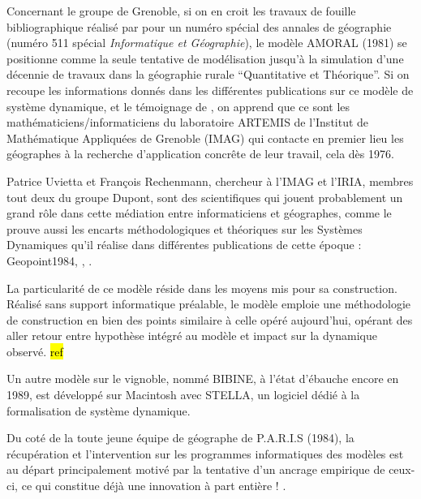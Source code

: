 Concernant le groupe de Grenoble, si on en croit les travaux de fouille bibliographique réalisé par \textcite{Rey1983} pour un numéro spécial des annales de géographie (numéro 511 spécial \textit{Informatique et Géographie}), le modèle AMORAL (1981) se positionne comme la seule tentative de modélisation jusqu'à la simulation d'une décennie de travaux dans la géographie rurale \enquote{Quantitative et Théorique}. Si on recoupe les informations donnés dans les différentes publications sur ce modèle de système dynamique, et le témoignage de \textcite{LeBerre1987}, on apprend que ce sont les mathématiciens/informaticiens du laboratoire ARTEMIS de l’Institut de Mathématique Appliquées de Grenoble (IMAG) qui contacte en premier lieu les géographes à la recherche d’application concrête de leur travail, cela dès 1976.

Patrice Uvietta et François Rechenmann, chercheur à l'IMAG et l'IRIA, membres tout deux du groupe Dupont, sont des scientifiques qui jouent probablement un grand rôle dans cette médiation entre informaticiens et géographes, comme le prouve aussi les encarts méthodologiques et théoriques sur les Systèmes Dynamiques qu'il réalise dans différentes publications de cette époque : Geopoint1984, \autocite{CGR1983}, \autocite{Guermond1984}. 

La particularité de ce modèle réside dans les moyens mis pour sa construction. Réalisé sans support informatique préalable, le modèle emploie une méthodologie de construction en bien des points similaire à celle opéré aujourd'hui, opérant des aller retour entre hypothèse intégré au modèle et impact sur la dynamique observé. \hl{ref} %

Un autre modèle sur le vignoble, nommé BIBINE, à l'état d'ébauche encore en 1989, est développé sur Macintosh avec STELLA, un logiciel dédié à la formalisation de système dynamique. \autocite{Chamussy1989}

Du coté de la toute jeune équipe de géographe de P.A.R.I.S (1984), la récupération et l'intervention sur les programmes informatiques des modèles est au départ principalement motivé par la tentative d’un ancrage empirique de ceux-ci, ce qui constitue déjà une innovation à part entière ! \autocite{Pumain1982}. 


